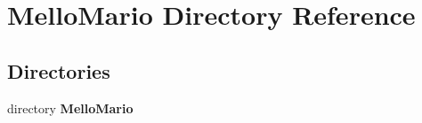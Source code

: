 \section{Mello\+Mario Directory Reference}
\label{dir_9a60d302b61dbb3f1b047b3eda49775f}
\subsection*{Directories}
\begin{DoxyCompactItemize}
\item 
directory \textbf{ Mello\+Mario}
\end{DoxyCompactItemize}
